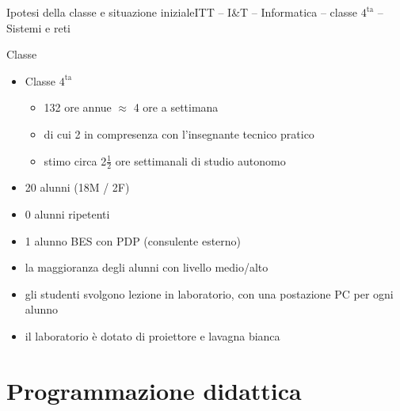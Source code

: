 \documentclass[italian]{beamer}
\begin{document}
\begin{frame}{Ipotesi della classe e situazione iniziale}{ITT -- I\&T -- Informatica -- classe $4^{\text{ta}}$ -- Sistemi e reti}
	
	\begin{block}{Classe}
		\begin{itemize}
			\item Classe $4^{\text{ta}}$
			\begin{itemize}
				\item 132 ore annue $\approx$ 4 ore a settimana
				\item di cui 2 in compresenza con l'insegnante tecnico pratico
				\item stimo circa 2$\frac{1}{2}$ ore settimanali di studio autonomo
			\end{itemize}			
			\item 20 alunni (18M / 2F)
			\item 0 alunni ripetenti
			\item 1 alunno BES con PDP (consulente esterno)
			\item la maggioranza degli alunni con livello medio/alto
			\item gli studenti svolgono lezione in laboratorio, con una postazione PC per ogni alunno
			\item il laboratorio \`e dotato di proiettore e lavagna bianca
		\end{itemize}
	\end{block}
	
\end{frame}

\section[Programmazione didattica]{Programmazione didattica}
\end{document}
